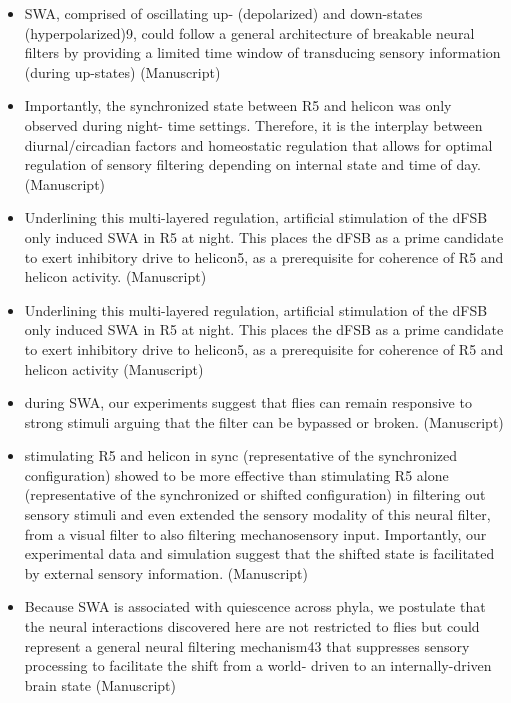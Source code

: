 \documentclass[11pt]{article}
\begin{document}
\begin{itemize}
    \item SWA, comprised of oscillating up- (depolarized) and down-states (hyperpolarized)9, could
    follow a general architecture of breakable neural filters by providing a limited time window of
    transducing sensory information (during up-states)
    \cite{raccugliaCoherentMultilevelNetwork2022} (Manuscript)

    \item Importantly, the synchronized state between R5 and helicon was only observed during night-
    time settings. Therefore, it is the interplay between diurnal/circadian factors and homeostatic
    regulation that allows for optimal regulation of sensory filtering depending on internal state
    and time of day.
    \cite{raccugliaCoherentMultilevelNetwork2022} (Manuscript)

    \item Underlining this multi-layered regulation, artificial stimulation of the dFSB
    only induced SWA in R5 at night. This places the dFSB as a prime candidate to exert inhibitory
    drive to helicon5, as a prerequisite for coherence of R5 and helicon activity.
    \cite{raccugliaCoherentMultilevelNetwork2022} (Manuscript)

    \item Underlining this multi-layered regulation, artificial stimulation of the dFSB
    only induced SWA in R5 at night. This places the dFSB as a prime candidate to exert inhibitory
    drive to helicon5, as a prerequisite for coherence of R5 and helicon activity
    \cite{raccugliaCoherentMultilevelNetwork2022} (Manuscript)

    \item during SWA, our experiments suggest that flies can remain responsive to strong stimuli arguing that the filter can be
    bypassed or broken.
    \cite{raccugliaCoherentMultilevelNetwork2022} (Manuscript)

    \item stimulating R5 and helicon in sync (representative of the
    synchronized configuration) showed to be more effective than stimulating R5 alone
    (representative of the synchronized or shifted configuration) in filtering out sensory stimuli
    and even extended the sensory modality of this neural filter, from a visual filter to also filtering
    mechanosensory input. Importantly, our experimental data and simulation suggest that the
    shifted state is facilitated by external sensory information.
    \cite{raccugliaCoherentMultilevelNetwork2022} (Manuscript)

    \item Because SWA is associated with quiescence across phyla, we postulate that the neural
    interactions discovered here are not restricted to flies but could represent a general neural
    filtering mechanism43 that suppresses sensory processing to facilitate the shift from a world-
    driven to an internally-driven brain state
    \cite{raccugliaCoherentMultilevelNetwork2022} (Manuscript)

\end{itemize}
\end{document}
